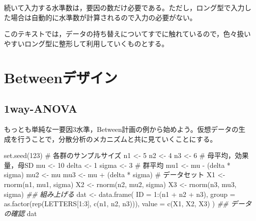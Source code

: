 \documentclass[
  a4paper,
]{ltjsbook}
\newenvironment{Shaded}{\begin{snugshade}}{\end{snugshade}}
\newcommand{\AttributeTok}[1]{\textcolor[rgb]{0.40,0.45,0.13}{#1}}
\newcommand{\CommentTok}[1]{\textcolor[rgb]{0.37,0.37,0.37}{#1}}
\newcommand{\DecValTok}[1]{\textcolor[rgb]{0.68,0.00,0.00}{#1}}
\newcommand{\DocumentationTok}[1]{\textcolor[rgb]{0.37,0.37,0.37}{\textit{#1}}}
\newcommand{\FunctionTok}[1]{\textcolor[rgb]{0.28,0.35,0.67}{#1}}
\newcommand{\NormalTok}[1]{\textcolor[rgb]{0.00,0.23,0.31}{#1}}
\newcommand{\OtherTok}[1]{\textcolor[rgb]{0.00,0.23,0.31}{#1}}
\newcommand{\SpecialCharTok}[1]{\textcolor[rgb]{0.37,0.37,0.37}{#1}}
\begin{document}
続いて入力する水準数は，要因の数だけ必要である。ただし，ロング型で入力した場合は自動的に水準数が計算されるので入力の必要がない。

このテキストでは，データの持ち替えについてすでに触れているので，色々扱いやすいロング型に整形して利用していくものとする。

\section{Betweenデザイン}\label{betweenux30c7ux30b6ux30a4ux30f3}

\subsection{1way-ANOVA}\label{way-anova}

もっとも単純な一要因3水準，Between計画の例から始めよう。仮想データの生成を行うことで，分散分析のメカニズムと共に見ていくことにする。

\begin{Shaded}
\begin{Highlighting}[]
\FunctionTok{set.seed}\NormalTok{(}\DecValTok{123}\NormalTok{)}
\CommentTok{\# 各群のサンプルサイズ}
\NormalTok{n1 }\OtherTok{\textless{}{-}} \DecValTok{5}
\NormalTok{n2 }\OtherTok{\textless{}{-}} \DecValTok{4}
\NormalTok{n3 }\OtherTok{\textless{}{-}} \DecValTok{6}
\CommentTok{\# 母平均，効果量，母SD}
\NormalTok{mu }\OtherTok{\textless{}{-}} \DecValTok{10}
\NormalTok{delta }\OtherTok{\textless{}{-}} \DecValTok{1}
\NormalTok{sigma }\OtherTok{\textless{}{-}} \DecValTok{3}
\CommentTok{\# 群平均}
\NormalTok{mu1 }\OtherTok{\textless{}{-}}\NormalTok{ mu }\SpecialCharTok{{-}}\NormalTok{ (delta }\SpecialCharTok{*}\NormalTok{ sigma)}
\NormalTok{mu2 }\OtherTok{\textless{}{-}}\NormalTok{ mu}
\NormalTok{mu3 }\OtherTok{\textless{}{-}}\NormalTok{ mu }\SpecialCharTok{+}\NormalTok{ (delta }\SpecialCharTok{*}\NormalTok{ sigma)}
\CommentTok{\# データセット}
\NormalTok{X1 }\OtherTok{\textless{}{-}} \FunctionTok{rnorm}\NormalTok{(n1, mu1, sigma)}
\NormalTok{X2 }\OtherTok{\textless{}{-}} \FunctionTok{rnorm}\NormalTok{(n2, mu2, sigma)}
\NormalTok{X3 }\OtherTok{\textless{}{-}} \FunctionTok{rnorm}\NormalTok{(n3, mu3, sigma)}
\DocumentationTok{\#\# 組み上げる}
\NormalTok{dat }\OtherTok{\textless{}{-}} \FunctionTok{data.frame}\NormalTok{(}
  \AttributeTok{ID =} \DecValTok{1}\SpecialCharTok{:}\NormalTok{(n1 }\SpecialCharTok{+}\NormalTok{ n2 }\SpecialCharTok{+}\NormalTok{ n3),}
  \AttributeTok{group =} \FunctionTok{as.factor}\NormalTok{(}\FunctionTok{rep}\NormalTok{(LETTERS[}\DecValTok{1}\SpecialCharTok{:}\DecValTok{3}\NormalTok{], }\FunctionTok{c}\NormalTok{(n1, n2, n3))),}
  \AttributeTok{value =} \FunctionTok{c}\NormalTok{(X1, X2, X3)}
\NormalTok{)}
\DocumentationTok{\#\# データの確認}
\NormalTok{dat}
\end{Highlighting}
\end{Shaded}
\end{document}

